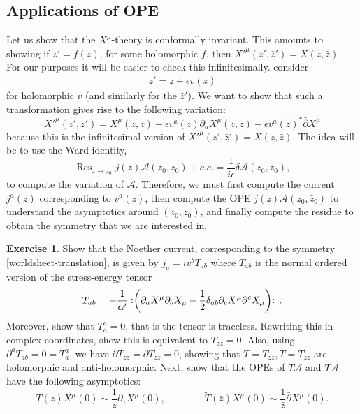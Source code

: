 \documentclass{report}
\theoremstyle{plain}
\theoremstyle{definition}
\newtheorem{exercise}{Exercise}[section]
\theoremstyle{remark}
\newcommand{\FR}[2]{\frac{#1}{#2}}
\newcommand{\ms}{\mathscr}
\newcommand{\di}{\partial}
\newcommand{\NO}[1]{\vcentcolon\mathrel{#1}\vcentcolon\,}
\DeclareMathOperator{\Res}{Res}
\begin{document}
\subsection{Applications of OPE}
Let us show that the $X^\mu$-theory is conformally invariant. This amounts
to showing if $z'=f(z)$, for some holomorphic $f$, then $X'^\mu(z',\bar z')
= X(z,\bar z)$. For our purposes it will be easier to check this
infinitesimally. consider 
\begin{align} z' = z+\epsilon v(z)
\label{worldsheet-translation}
\end{align}
for holomorphic $v$ (and similarly for the $\bar z'$).
We want to show that such a transformation gives rise to the following variation:
\[X'^\mu(z',\bar z')=X^\mu(z,\bar z)-\epsilon v^a(z)\di_a X^\mu(z,\bar
z) - \epsilon v^a(z)^* \bar\di X^\mu\]
because this is the infinitesimal version of $X'^\mu(z',\bar z')
= X(z,\bar z)$. The idea will be to use the Ward identity,
\[ \Res_{z \to z_0} j(z) \ms A(z_0,\bar z_0) + c.c. =
\FR{1}{i\epsilon}\delta \ms A(z_0,\bar z_0),\] to compute the variation of
$\ms A$. Therefore, we must first compute the current $j^a(z)$
corresponding to $v^a(z)$, then compute the OPE $j(z)\ms A(z_0,\bar z_0)$
to understand the asymptotics around $(z_0,\bar z_0)$, and finally compute
the residue to obtain the symmetry that we are interested in.

\begin{exercise} Show that the Noether current, corresponding to the
symmetry \eqref{worldsheet-translation}, is given by $j_a = iv^b T_{ab}$
where $T_{ab}$ is the normal ordered version of the stress-energy
tensor \[T_{ab} = -\FR{1}{\alpha'} \NO{ \left( \di_a X^\mu\di_b
X_\mu - \FR{1}{2}\delta_{ab}\di_c X^\mu\di^c X_\mu \right)}.\]
Moreover, show that $T_a^a = 0$, that is the tensor is traceless. Rewriting
this in complex coordinates, show this is equivalent to $T_{z\bar z} = 0$.
Also, using $\di^aT_{ab} = 0 = T^a_a$, we have $\bar\di T_{zz} = \di
T_{\bar z\bar z} = 0$, showing that $T = T_{zz}, \tilde T = T_{\bar z\bar
z}$ are holomorphic and anti-holomorphic. Next, show that the OPEs of $T\ms
A$ and $\tilde T\ms A$ have the following asymptotics:
\[ T(z) X^\mu(0) \sim \FR{1}{z} \di_zX^\mu(0), \qquad\qquad 
\tilde T(\bar z)X^\mu(0) \sim \FR{1}{\bar z}\bar\di X^\mu(0).\]
\end{exercise}
\end{document}
